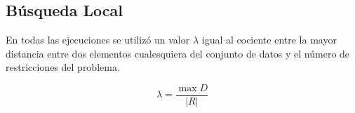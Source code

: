 \vspace*{\fill}

\newpage

\subsection{Búsqueda Local}

En todas las ejecuciones se utilizó un valor $\lambda$ igual al cociente entre la mayor distancia entre dos elementos cualesquiera del conjunto de datos y el número de restricciones del problema.

\begin{equation}    
    \lambda = \frac{\max D}{|R|}
\end{equation}

\vspace{\baselineskip}


\vspace*{\fill}

